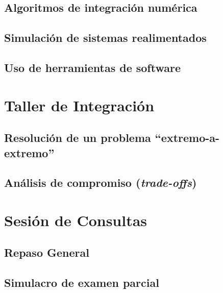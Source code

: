 \documentclass[11pt,a4paper,openany]{book}
\begin{document}
\section{Algoritmos de integración numérica}

\section{Simulación de sistemas realimentados}

\section{Uso de herramientas de software}



\chapter{Taller de Integración}

\section{Resolución de un problema ``extremo-a-extremo''}

\section{Análisis de compromiso (\textit{trade-offs})}

\chapter{Sesión de Consultas}

\section{Repaso General}

\section{Simulacro de examen parcial}


%
\end{document}
